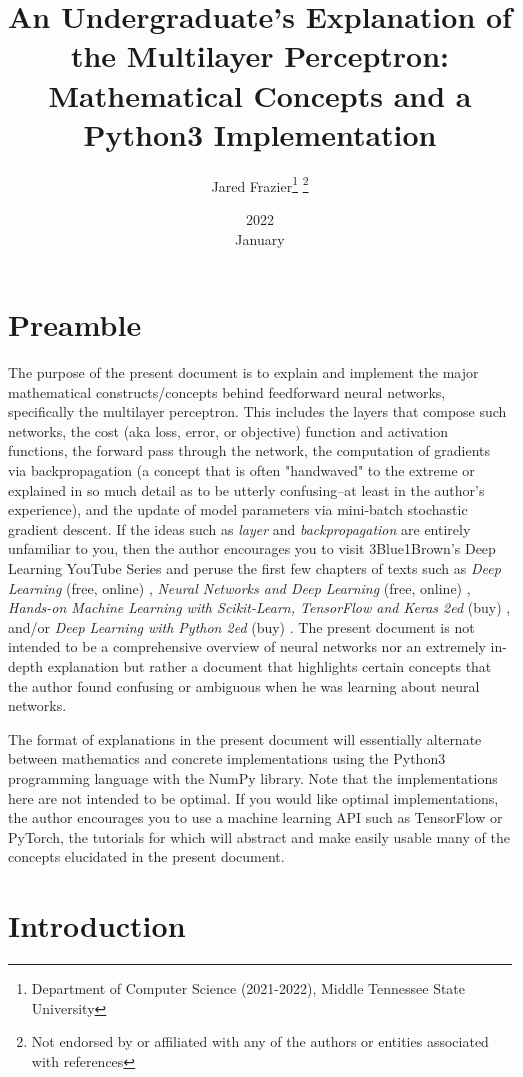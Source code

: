 \documentclass{article}
\title{
	An Undergraduate's Explanation of the Multilayer Perceptron: 
	Mathematical Concepts and a Python3 Implementation}
\date{2022 \\ January}
\author{Jared Frazier\thanks{Department of Computer Science (2021-2022), 
Middle Tennessee State University} \thanks{Not endorsed by or affiliated with any of the 
authors or entities associated with references}}
\begin{document}
\maketitle

\section{Preamble}
\quad The purpose of the present document is to explain and implement the major mathematical
constructs/concepts behind feedforward neural networks, specifically the multilayer perceptron.
This includes the layers that compose such networks, the cost (aka loss, error, or objective) function
and activation functions, the forward pass through the network,
the computation of gradients via backpropagation (a concept that is often "handwaved" to the extreme
or explained in so much detail as to be utterly confusing--at least in the author's experience),
and the update of model parameters via mini-batch stochastic gradient descent.
If the ideas such as \textit{layer} and \textit{backpropagation} are entirely unfamiliar
to you, then the author encourages you to visit 3Blue1Brown's Deep Learning YouTube Series \cite{3Blue1BrownWhatIsANN2017}
and peruse the first few chapters of texts such as \textit{Deep Learning} (free, online) \cite{Goodfellow2016},
\textit{Neural Networks and Deep Learning} (free, online) \cite{Nielsen2015},
\textit{Hands-on Machine Learning with Scikit-Learn, TensorFlow and Keras 2ed} (buy) \cite{Geron2020},
and/or \textit{Deep Learning with Python 2ed} (buy) \cite{Chollet2021}. The present document
is not intended to be a comprehensive overview of neural networks nor an extremely
in-depth explanation but rather a document that highlights certain concepts that the
author found confusing or ambiguous when he was learning about neural networks.

The format of explanations in the present document will essentially alternate between mathematics
and concrete implementations using the Python3 programming language with
the NumPy library. Note that the implementations here
are not intended to be optimal. If you would like optimal implementations, the author
encourages you to use a machine learning API such as TensorFlow or PyTorch, the tutorials
for which will abstract and make easily usable many of the concepts elucidated in
the present document.

\section{Introduction}
\end{document}
